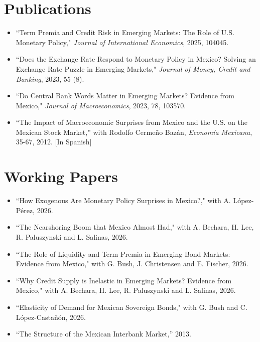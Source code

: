 \documentclass[12pt]{article}
\newcommand{\vsect}{\vspace{0.08cm}}
\begin{document}
	
	\section{Publications} 
	\vsect
	\begin{itemize}[label={},itemindent=-2em,leftmargin=2em,noitemsep,topsep=0pt]
		\item ``Term Premia and Credit Risk in Emerging Markets: The Role of U.S. Monetary Policy," \textit{Journal of International Economics}, 2025, 104045.
		\item ``Does the Exchange Rate Respond to Monetary Policy in Mexico? Solving an Exchange Rate Puzzle in Emerging Markets," \textit{Journal of Money, Credit and Banking}, 2023, 55 (8). %
		\item ``Do Central Bank Words Matter in Emerging Markets? Evidence from Mexico," \textit{Journal of Macroeconomics}, 2023, 78, 103570.
		\item ``The Impact of Macroeconomic Surprises from Mexico and the U.S. on the Mexican Stock Market,” with Rodolfo Cermeño Bazán, \textit{Economía Mexicana}, 35-67, 2012. [In Spanish]
	\end{itemize}
	
	
	\section{Working Papers}
	\vsect
	\begin{itemize}[label={},itemindent=-2em,leftmargin=2em,noitemsep,topsep=0pt]
	\item ``How Exogenous Are Monetary Policy Surprises in Mexico?," with A. López-Pérez, 2026.
	\item ``The Nearshoring Boom that Mexico Almost Had," with A. Bechara, H. Lee, R. Paluszynski and L. Salinas, 2026.
	\item ``The Role of Liquidity and Term Premia in Emerging Bond Markets: Evidence from Mexico," with G. Bush, J. Christensen and E. Fischer, 2026.
	\item ``Why Credit Supply is Inelastic in Emerging Markets? Evidence from Mexico," with A. Bechara, H. Lee, R. Paluszynski and L. Salinas, 2026.
	\item ``Elasticity of Demand for Mexican Sovereign Bonds," with G. Bush and C. López-Castañón, 2026.
	\item ``The Structure of the Mexican Interbank Market,” 2013.
	\end{itemize}
	
\end{document}
